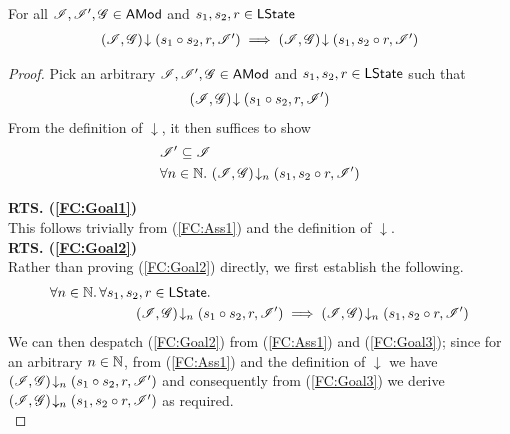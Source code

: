 \begin{lemma}\label{lem:forget-closure}
For all $\mathscr{I}, \mathscr{I}', \mathscr{G} \in \textsf{AMod}$ and $s_1, s_2, r \in \textsf{LState}$
%
\[
\begin{array}{l}
	\left(\mathscr{I}, \mathscr{G}\right) \!\downarrow \left(s_1 \circ s_2, r, \mathscr{I}'\right) \implies 
	\left(\mathscr{I}, \mathscr{G}\right) \!\downarrow \left(s_1, s_2 \circ r, \mathscr{I}'\right)
\end{array}
\]
%
\begin{proof} Pick an arbitrary $\mathscr{I}, \mathscr{I}', \mathscr{G} \in \textsf{AMod}$ and $s_1, s_2, r \in \textsf{LState}$ such that 
%
\begin{align}
	\left(\mathscr{I}, \mathscr{G}\right) \!\downarrow \left(s_1 \circ s_2, r, \mathscr{I}'\right) \label{FC:Ass1}
\end{align} 
%
From the definition of $\downarrow$, it then suffices to show
%
\begin{align}
	& \mathscr{I}' \subseteq \mathscr{I} \label{FC:Goal1}\\
	& \forall n \in \mathbb{N}.\,  \left(\mathscr{I}, \mathscr{G}\right) \!\downarrow_{n} \left(s_1, s_2 \circ r, \mathscr{I}'\right) \label{FC:Goal2}
\end{align}
%

\noindent\textbf{RTS. (\ref{FC:Goal1})} \\
This follows trivially from (\ref{FC:Ass1}) and the definition of $\downarrow$.\\

\noindent\textbf{RTS. (\ref{FC:Goal2})} \\
Rather than proving (\ref{FC:Goal2}) directly, we first establish the following.
%
\begin{align}
	\for {n \in \Nats} \for{s_1, s_2, r \in \LStates} & \nonumber\\
	& \hspace{-2cm}\extendsAMUpto{\lmod, \gmod}{n}{s_1 \composeL s_2}{r}{\lmod'} \implies \extendsAMUpto{\lmod, \gmod}{n}{s_1}{s_2 \composeL r}{\lmod'} \label{FC:Goal3}
\end{align}
%
We can then despatch (\ref{FC:Goal2}) from (\ref{FC:Ass1}) and (\ref{FC:Goal3}); since for an arbitrary $n \in \mathbb{N}$, from (\ref{FC:Ass1}) and the definition of $\downarrow$ we have $\left(\mathscr{I}, \mathscr{G}\right) \!\downarrow_{n} \left(s_1 \circ s_2, r, \mathscr{I}'\right)$ and consequently from (\ref{FC:Goal3}) we derive $\left(\mathscr{I}, \mathscr{G}\right) \!\downarrow_{n} \left(s_1, s_2 \circ r, \mathscr{I}'\right) $ as required. \\


\end{proof}
\end{lemma}
